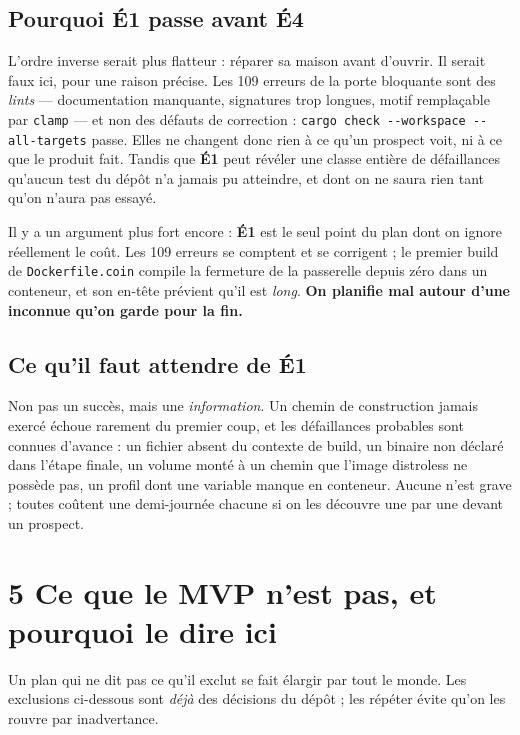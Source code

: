 \documentclass[11pt]{article}
\newcommand{\code}[1]{\texttt{\small #1}}
\newcommand{\mm}[1]{\textbf{#1}}
\begin{document}
\subsection{Pourquoi \mm{É1} passe avant \mm{É4}}
L'ordre inverse serait plus flatteur : réparer sa maison avant d'ouvrir. Il serait faux ici, pour une
raison précise. Les 109 erreurs de la porte bloquante sont des \emph{lints} --- documentation
manquante, signatures trop longues, motif remplaçable par \code{clamp} --- et non des défauts de
correction : \code{cargo check -{}-workspace -{}-all-targets} passe. Elles ne changent donc rien à ce
qu'un prospect voit, ni à ce que le produit fait. Tandis que \mm{É1} peut révéler une classe entière
de défaillances qu'aucun test du dépôt n'a jamais pu atteindre, et dont on ne saura rien tant qu'on
n'aura pas essayé.

Il y a un argument plus fort encore : \mm{É1} est le seul point du plan dont on ignore réellement le
coût. Les 109 erreurs se comptent et se corrigent ; le premier build de \code{Dockerfile.coin}
compile la fermeture de la passerelle depuis zéro dans un conteneur, et son en-tête prévient qu'il est
\emph{long}. \textbf{On planifie mal autour d'une inconnue qu'on garde pour la fin.}

\subsection{Ce qu'il faut attendre de \mm{É1}}
Non pas un succès, mais une \emph{information}. Un chemin de construction jamais exercé échoue
rarement du premier coup, et les défaillances probables sont connues d'avance : un fichier absent du
contexte de build, un binaire non déclaré dans l'étape finale, un volume monté à un chemin que
l'image distroless ne possède pas, un profil dont une variable manque en conteneur. Aucune n'est
grave ; toutes coûtent une demi-journée chacune si on les découvre une par une devant un prospect.

\section{5 \;\textbar\; Ce que le MVP n'est pas, et pourquoi le dire ici}

Un plan qui ne dit pas ce qu'il exclut se fait élargir par tout le monde. Les exclusions ci-dessous
sont \emph{déjà} des décisions du dépôt ; les répéter évite qu'on les rouvre par inadvertance.
\end{document}
